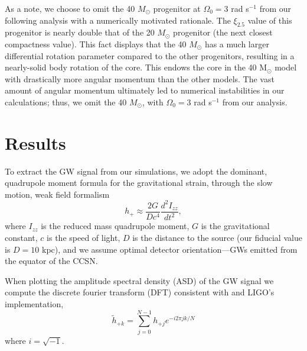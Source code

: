 \documentclass[twocolumn,times]{aastex62}  %
\newcommand{\Msun}{\ensuremath{\mathrm{M}_\odot}\xspace}
\begin{document}
As a note, we choose to omit the 40 $M_\odot$ progenitor at $\Omega_0 = 3$ rad s$^{-1}$ from our following analysis with a numerically motivated rationale.  The $\xi_{2.5}$ value of this progenitor is nearly double that of the 20 $M_\odot$ progenitor (the next closest compactness value).  This fact displays that the 40 $M_\odot$ has a much larger differential rotation parameter compared to the other progenitors, resulting in a nearly-solid body rotation of the core. This endows the core in the 40 \Msun model with drastically more angular momentum than the other models.  The vast amount of angular momentum ultimately led to numerical instabilities in our calculations; thus, we omit the 40 $M_\odot$, with $\Omega_0 = 3$ rad s$^{-1}$ from our analysis.  \\




%


\section{Results}
\label{sec:results}

To extract the GW signal from our simulations, we adopt the dominant, quadrupole moment formula for the gravitational strain, through the slow motion, weak field formalism %
\citep[eg.][]{finn:1990,blanchet:1990}
\begin{equation}
    h_+ \approx \frac{2G}{Dc^4}
    \frac{d^2I_{zz}}{dt^2},
\label{eq:quad}
\end{equation}
where $I_{zz}$ is the reduced mass quadrupole moment, $G$ is the gravitational constant, $c$ is the speed of light, $D$ is the distance to the source (our fiducial value is $D=10$ kpc), and we assume optimal detector orientation---GWs emitted from the equator of the CCSN.\\
\par When plotting the amplitude spectral density (ASD) of the GW signal we compute the discrete fourier transform (DFT) consistent with \citet{anderson:2004} and LIGO's implementation,
\begin{equation}
\widetilde{h}_{+k} = \sum^{N-1}_{j=0} h_{+j} e^{-i2\pi jk/N}
\label{eq:dft}
\end{equation}
where $i=\sqrt{-1}$.
\end{document}
